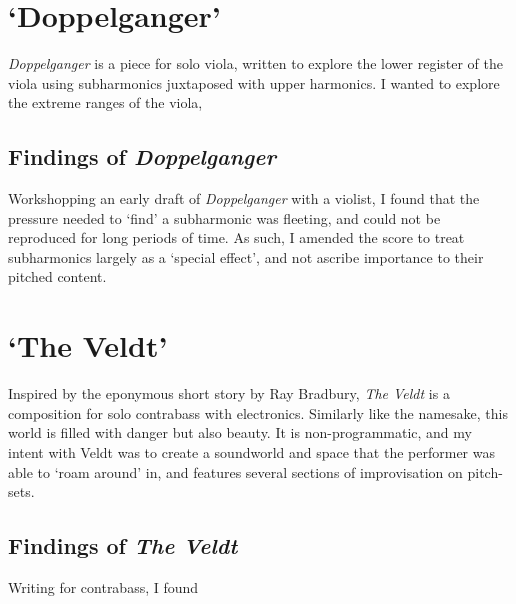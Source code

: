 \section{`Doppelganger'}
\emph{Doppelganger} is a piece for solo viola, written to explore the lower register of the viola using subharmonics juxtaposed with upper harmonics. 
I wanted to explore the extreme ranges of the viola,


\subsection{Findings of \emph{Doppelganger}}
Workshopping an early draft of \emph{Doppelganger} with a violist, I found that the pressure needed to `find' a subharmonic was fleeting, and could not be reproduced for long periods of time.
As such, I amended the score to treat subharmonics largely as a `special effect', and not ascribe importance to their pitched content.


\section{`The Veldt'}
Inspired by the eponymous short story by Ray Bradbury, \textit{The Veldt} is a composition for solo contrabass with electronics. 
Similarly like the namesake, this world is filled with danger but also beauty. 
It is non-programmatic, and my intent with Veldt was to create a soundworld and space that the performer was able to `roam around' in, and features several sections of improvisation on pitch-sets.

\subsection{Findings of \emph{The Veldt}}
Writing for contrabass, I found 
